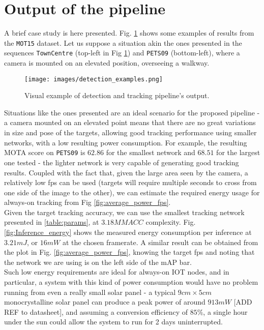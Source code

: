 \appendix

\section{Output of the pipeline}

A brief case study is here presented. Fig. \ref{fig:detresults_macc} shows some examples of results from the \texttt{MOT15} dataset. Let us suppose a situation akin the ones presented in the sequences \texttt{TownCentre}  (top-left in Fig \ref{fig:detresults_macc}) and \texttt{PETS09} (bottom-left), where a camera is mounted on an elevated position, overseeing a walkway.

\begin{figure}[h]
  \centering
  \texttt{[image: images/detection\_examples.png]}
  \caption{Visual example of detection and tracking pipeline's output.}
  \label{fig:detresults_macc}
\end{figure}

Situations like the ones presented are an ideal scenario for the proposed pipeline - a camera mounted on an elevated point means that there are no great variations in size and pose of the targets, allowing good tracking performance using smaller networks, with a low resulting power consumption. For example, the resulting MOTA score on \texttt{PETS09} is $62.86$ for the smallest network and $68.51$ for the largest one tested - the lighter network is very capable of generating good tracking results. Coupled with the fact that, given the large area seen by the camera, a relatively low fps can be used (targets will require multiple seconds to cross from one side of the image to the other), we can estimate the required energy usage for always-on tracking from Fig \ref{fig:average_power_fps}.\\
Given the target tracking accuracy, we can use the smallest tracking network presented in \ref{table:params}, at $3.18 MMACC$ complexity. Fig. \ref{fig:Inference_energy} shows the measured energy consumption per inference at $3.21 mJ$, or $16 mW$ at the chosen framerate. A similar result can be obtained from the plot in Fig. \ref{fig:average_power_fps}, knowing the target fps and noting that the network we are using is on the left side of the mAP bar.\\

Such low energy requirements are ideal for always-on IOT nodes, and in particular, a system with this kind of power consumption would have no problem running from even a really small solar panel - a typical $9cm \times 5cm$ monocrystalline solar panel can produce a peak power of around $913mW$
[ADD REF to datasheet], 
and assuming a conversion efficiency of $85\%$, a single hour under the sun could allow the system to run for 2 days uninterrupted.

